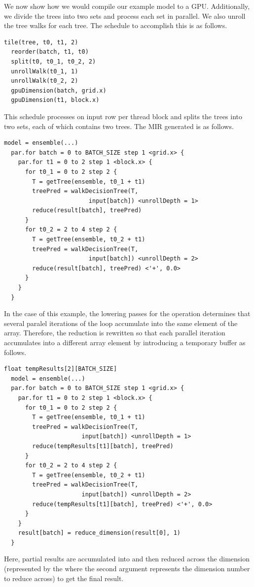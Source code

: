 We now show how we would compile our example model to a GPU. 
Additionally, we divide the trees into two sets and process each set
in parallel. We also unroll the tree walks for each tree.
The schedule to accomplish this is as follows.
\begin{lstlisting}[style=c++]
  tile(tree, t0, t1, 2)
  reorder(batch, t1, t0)
  split(t0, t0_1, t0_2, 2)
  unrollWalk(t0_1, 1)
  unrollWalk(t0_2, 2)
  gpuDimension(batch, grid.x)
  gpuDimension(t1, block.x)
\end{lstlisting}
This schedule processes on input row per thread block 
and splits the trees into two sets, each of which contains 
two trees. The MIR generated is as follows. 
\begin{lstlisting}[style=c++]
  model = ensemble(...)
  par.for batch = 0 to BATCH_SIZE step 1 <grid.x> {
    par.for t1 = 0 to 2 step 1 <block.x> {
      for t0_1 = 0 to 2 step 2 {
        T = getTree(ensemble, t0_1 + t1)
        treePred = walkDecisionTree(T, 
                        input[batch]) <unrollDepth = 1>
        reduce(result[batch], treePred)
      }
      for t0_2 = 2 to 4 step 2 {
        T = getTree(ensemble, t0_2 + t1)
        treePred = walkDecisionTree(T,
                        input[batch]) <unrollDepth = 2>
        reduce(result[batch], treePred) <'+', 0.0>
      }
    }
  }
\end{lstlisting}

In the case of this example, the lowering passes for the 
operation determines that several paralel iterations of the  
loop accumulate into the same element of the  array.
Therefore, the reduction is rewritten so that each parallel 
iteration accumulates into a different array element by introducing 
a temporary buffer as follows.
\begin{lstlisting}[style=c++]
  float tempResults[2][BATCH_SIZE]
  model = ensemble(...)
  par.for batch = 0 to BATCH_SIZE step 1 <grid.x> {
    par.for t1 = 0 to 2 step 1 <block.x> {
      for t0_1 = 0 to 2 step 2 {
        T = getTree(ensemble, t0_1 + t1)
        treePred = walkDecisionTree(T, 
                      input[batch]) <unrollDepth = 1>
        reduce(tempResults[t1][batch], treePred)
      }
      for t0_2 = 2 to 4 step 2 {
        T = getTree(ensemble, t0_2 + t1)
        treePred = walkDecisionTree(T,
                      input[batch]) <unrollDepth = 2>
        reduce(tempResults[t1][batch], treePred) <'+', 0.0>
      }
    }
    result[batch] = reduce_dimension(result[0], 1)
  }
\end{lstlisting}
Here, partial results are accumulated into  and then
reduced across the  dimension (represented by the 
where the second argument represents the dimension number to reduce across)
to get the final result.

